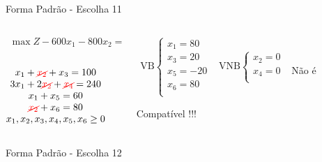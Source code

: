\documentclass{beamer}
\begin{document}
\begin{frame}
{\begin{block}{Forma Padrão - {\color{cyan}Escolha 11}}
			\begin{columns}
				\begin{column}{0.35\textwidth}
					$
						\begin{matrix}
							\max Z - 600x_1 - 800x_2 = 0 \\
						\end{matrix}
					$ \\
					 \\
					$
						\begin{matrix}
							x_1  + {\color{red}\cancel{x_2}}  + x_3                   = 100 \\
							3x_1 + 2{\color{red}\cancel{x_2}}       + {\color{red}\cancel{x_4}}             = 240 \\
							x_1                     + x_5       = 60 \\
							{\color{red}\cancel{x_2}}                           + x_6 = 80 \\
							x_1,x_2, x_3, x_4, x_5, x_6 \ge 0 \\
						\end{matrix}
					$
				\end{column}
				\vline
				\hspace{0.1cm}
				\begin{column}{0.45\textwidth}
						$
							\begin{matrix}
								\text{VB} \left\{  \begin{matrix}
																 x_1 = 80 \\
																 x_3 = 20 \\
																 x_5 = -20 \\
																 x_6 = 80 \\
												   \end{matrix} 
										   \right.
								&
								\text{VNB} \left\{  \begin{matrix}
																 x_2 = 0 \\
																 x_4 = 0 \\
												   \end{matrix} 
										   \right. 
								\\
							 & \\
							\end{matrix}
						$
						{\color{red}Não é Compatível !!!}
				\end{column}
			\end{columns}
		\end{block}
	}
	{
		\begin{block}{Forma Padrão - {\color{cyan}Escolha 12}}

\end{block}}
\end{frame}
\end{document}
